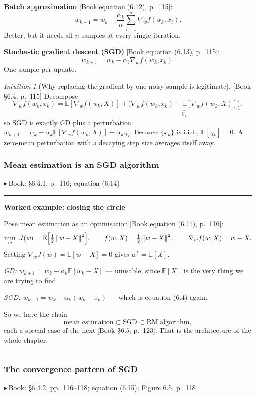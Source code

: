 \documentclass[11pt, letterpaper]{article}
\theoremstyle{runin}
\theoremstyle{runinplain}
\theoremstyle{remark}
\newtheorem*{intuition}{Intuition}
\newcommand{\E}{\mathbb{E}}
\newcommand{\norm}[1]{\left\lVert #1 \right\rVert}
\newcommand{\bk}[1]{{\color{bookblue}\small$\blacktriangleright$\,\textsf{Book: #1}}}
\newcommand{\bkin}[1]{{\color{bookblue}\small[\textsf{Book #1}]}}
\newenvironment{worked}[1]
  {\par\medskip\noindent\rule{\textwidth}{0.4pt}\par\nobreak\vspace{0.3em}
   \noindent\textbf{Worked example: #1}\par\nobreak\vspace{0.2em}\small}
  {\par\nobreak\vspace{0.3em}\noindent\rule{\textwidth}{0.4pt}\par\medskip}
\begin{document}
\textbf{Batch approximation} \bkin{equation (6.12), p.~115}:
\[
  w_{k+1}=w_k-\frac{\alpha_k}{n}\sum_{i=1}^n\nabla_wf(w_k,x_i).
\]
Better, but it needs all $n$ samples at every single iteration.

\textbf{Stochastic gradient descent (SGD)} \bkin{equation (6.13), p.~115}:
\[
  \boxed{\;w_{k+1}=w_k-\alpha_k\nabla_wf(w_k,x_k).\;}
\]
One sample per update.

\begin{intuition}[Why replacing the gradient by one noisy sample is legitimate]
\bkin{\S6.4, p.~115} Decompose
\[
  \nabla_wf(w_k,x_k)=\E[\nabla_wf(w_k,X)]
    +\underbrace{\bigl(\nabla_wf(w_k,x_k)-\E[\nabla_wf(w_k,X)]\bigr)}_{\eta_k},
\]
so SGD is exactly GD plus a perturbation:
$w_{k+1}=w_k-\alpha_k\E[\nabla_wf(w_k,X)]-\alpha_k\eta_k$. Because $\{x_k\}$ is
i.i.d., $\E[\eta_k]=0$. A zero-mean perturbation with a decaying step size averages
itself away.
\end{intuition}

\subsubsection{Mean estimation is an SGD algorithm}

\bk{\S6.4.1, p.~116; equation (6.14)}

\begin{worked}{closing the circle}
Pose mean estimation as an optimisation \bkin{equation (6.14), p.~116}:
\[
  \min_w\ J(w)=\E\Bigl[\tfrac12\norm{w-X}^2\Bigr],
  \qquad f(w,X)=\tfrac12\norm{w-X}^2,\qquad \nabla_wf(w,X)=w-X .
\]
Setting $\nabla_wJ(w)=\E[w-X]=0$ gives $w^*=\E[X]$. \checkmark

\emph{GD:} $w_{k+1}=w_k-\alpha_k\E[w_k-X]$ --- unusable, since $\E[X]$ is the
very thing we are trying to find.

\emph{SGD:} $w_{k+1}=w_k-\alpha_k(w_k-x_k)$ --- which is equation (6.4) again.

So we have the chain
\[
  \text{mean estimation} \subset \text{SGD} \subset \text{RM algorithm},
\]
each a special case of the next \bkin{\S6.5, p.~123}. That is the architecture of
the whole chapter.
\end{worked}

\subsubsection{The convergence pattern of SGD}

\bk{\S6.4.2, pp.~116--118; equation (6.15); Figure 6.5, p.~118}
\end{document}
